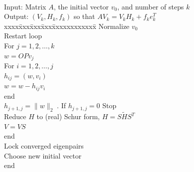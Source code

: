 \begin{algorithm}~\rm
\begin{tabbing}
Input: Matrix $A$, the initial vector $v_0$, and number of steps $k$ \\
Output: $(V_k,H_k,f_k)$ so that $AV_k=V_kH_k+f_ke_k^T$ \\
xxxx\=xxx\=xxx\=xxx\=xxxxxxxxxxxx\=\kill
\> Normalize $v_0$\\
\> Restart loop\\
\> \> For $j=1,2,\ldots,k$\\
\> \> \> $w=O\!Pv_j$ \\
\> \> \> For $i=1,2,\ldots,j$ \\
\> \> \> \> $h_{ij}=(w,v_i)$ \\
\> \> \> \> $w=w-h_{ij}v_i$ \\
\> \> \> end\\
\> \> \> $h_{j+1,j}=\|w\|_2\;$. \> \>If $h_{j+1,j}=0$ Stop \\
\> \> \> Reduce $H$ to (real) Schur form, $H=S\tilde{H}S^T$\\
\> \> \> $V=VS$ \\
\> \> end\\
\> \> Lock converged eigenpairs\\
\> \> Choose new initial vector\\
\> end\\
\end{tabbing}
\end{algorithm}

%

